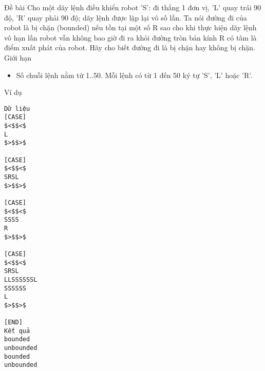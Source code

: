 Đề bài
Cho một dãy lệnh điều khiển robot 'S': đi thẳng 1 đơn vị, 'L' quay trái 90 độ, 'R' quay phải 90 độ; dãy lệnh được lặp lại vô số lần. Ta nói đường đi của robot là bị chặn (bounded) nếu tồn tại một số R sao cho khi thực hiện dãy lệnh vô hạn lần robot vẫn không bao giờ đi ra khỏi đường tròn bán kính R có tâm là điểm xuất phát của robot. Hãy cho biết đường đi là bị chặn hay không bị chặn.
Giới hạn
\begin{itemize}
	\item     Số chuỗi lệnh nằm từ 1..50. Mỗi lệnh có từ 1 đến 50 ký tự 'S', 'L' hoặc 'R'.   
\end{itemize}
Ví dụ
\begin{verbatim}
Dữ liệu
[CASE]
$<$$<$
L
$>$$>$

[CASE]
$<$$<$
SRSL
$>$$>$

[CASE]
$<$$<$
SSSS
R
$>$$>$

[CASE]
$<$$<$
SRSL
LLSSSSSSL
SSSSSS
L
$>$$>$

[END]
Kết quả
bounded
unbounded
bounded
unbounded
\end{verbatim}